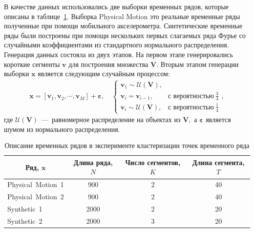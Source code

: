 В качестве данных использовались две выборки временных рядов, которые описаны в таблице~\ref{table_1}. 
Выборка Physical Motion это реальные временные ряды полученные при помощи мобильного акселерометра. 
Синтетические временные ряды были построены при помощи нескольких первых слагаемых ряда Фурье со случайными коэффициентами из стандартного нормального распределения. 
Генерация данных состояла из двух этапов. 
На первом этапе генерировались короткие сегменты $\textbf{v}$ для построения множества $\mathbf{V}$. 
Вторым этапом генерации выборки $\textbf{x}$ является следующим случайным процессом:
\[
\label{eq:exp:1}
\begin{aligned}
\textbf{x} = [\textbf{v}_{1}, \textbf{v}_{2}, \cdots, \textbf{v}_{M}] + \bm{\varepsilon}, \quad \begin{cases}
    \textbf{v}_{1} \sim \mathcal{U}\left(\mathbf{V}\right),\\
    \textbf{v}_{i} = \textbf{v}_{i - 1}, & \text{с вероятностью}~\frac{3}{4}\\
    \textbf{v}_{i} \sim \mathcal{U}\left(\mathbf{V}\right), & \text{с вероятностью}~\frac{1}{4}
\end{cases},
\end{aligned}
\]
где $\mathcal{U}\left(\mathbf{V}\right)$~---~равномерное распределение на объектах из $\mathbf{V},$ а $\bm{\varepsilon}$ является шумом из нормального распределения.

\begin{table}[h!t]
\begin{center}
\caption{Описание временных рядов в эксперименте кластеризации точек временного ряда}
\label{table_1}
\begin{tabular}{|c|c|c|c|}
\hline
	Ряд, $\textbf{x}$ &Длина ряда, $N$& Число сегментов, $K$&Длина сегмента, $T$\\
	\hline
	\multicolumn{1}{|l|}{Physical~Motion~1}
	& 900& 2& 40\\
	\hline
	\multicolumn{1}{|l|}{Physical~Motion~2}
	& 900& 2& 40\\
	\hline
	\multicolumn{1}{|l|}{Synthetic~1}
	& 2000& 2& 20\\
	\hline
	\multicolumn{1}{|l|}{Synthetic~2}
	& 2000& 3& 20\\
\hline

\end{tabular}
\end{center}
\end{table}

